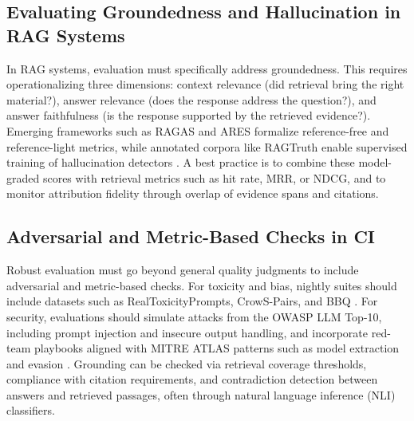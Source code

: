 
\subsection{Evaluating Groundedness and Hallucination in RAG Systems}
In RAG systems, evaluation must specifically address groundedness. This requires operationalizing three dimensions: context relevance (did retrieval bring the right material?), answer relevance (does the response address the question?), and answer faithfulness (is the response supported by the retrieved evidence?). Emerging frameworks such as RAGAS and ARES formalize reference-free and reference-light metrics, while annotated corpora like RAGTruth enable supervised training of hallucination detectors \cite{ragas_eacl2024,ares,ragtruth}. A best practice is to combine these model-graded scores with retrieval metrics such as hit rate, MRR, or NDCG, and to monitor attribution fidelity through overlap of evidence spans and citations.

\subsection{Adversarial and Metric-Based Checks in CI}
Robust evaluation must go beyond general quality judgments to include adversarial and metric-based checks. For toxicity and bias, nightly suites should include datasets such as RealToxicityPrompts, CrowS-Pairs, and BBQ \cite{gehman2020realtoxicity,crowsPairs2020,bbq2022}. For security, evaluations should simulate attacks from the OWASP LLM Top-10, including prompt injection and insecure output handling, and incorporate red-team playbooks aligned with MITRE ATLAS patterns such as model extraction and evasion \cite{owasp_llm}. Grounding can be checked via retrieval coverage thresholds, compliance with citation requirements, and contradiction detection between answers and retrieved passages, often through natural language inference (NLI) classifiers.

